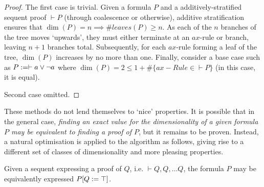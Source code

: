     \begin{proof}
        The first case is trivial.
        Given a formula $P$ and a additively-stratified sequent proof $\vdash P$ (through coalescence or otherwise), additive stratification ensures that $\dim(P) = n \implies \#leaves(P) \geq n$.
        As each of the $n$ branches of the tree moves `upwards', they must either terminate at an $ax$-rule or branch, leaving $n + 1$ branches total.
        Subsequently, for each $ax$-rule forming a leaf of the tree, $\dim(P)$ increases by no more than one.
        Finally, consider a base case such as $P := \vdash a \vee \neg a$ where $\dim(P) = 2 \leq 1 + \#\{ax-Rule \in \vdash P\}$ (in this case, it is equal).
        
        Second case omitted. %
    \end{proof}


    \begin{remark*}
        These methods do not lend themselves to `nice' properties.
        It is possible that in the general case, \textit{finding an exact value for the dimensionality of a given formula $P$ may be equivalent to finding a proof of $P$}, but it remains to be proven.
        Instead, a natural optimisation is applied to the algorithm as follows, giving rise to a different set of classes of dimensionality and more pleasing properties.
    \end{remark*} 

    \begin{definition*}
         Given a sequent expressing a proof of $Q$, i.e. $\vdash Q, Q, \ldots Q$, the formula $P$ may be equivalently expressed $P[Q := \top]$.
    \end{definition*}

